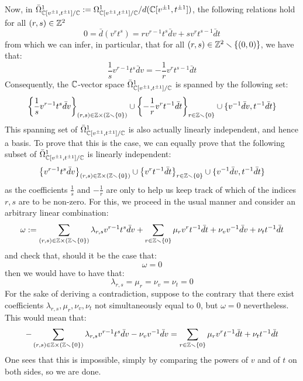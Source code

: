 \begin{example}
            Now, in $\bar{\Omega}^1_{\mathbb{C}[v^{\pm 1}, t^{\pm 1}]/\mathbb{C}} := \Omega^1_{\mathbb{C}[v^{\pm 1}, t^{\pm 1}]/\mathbb{C}}/d( \mathbb{C}[v^{\pm 1}, t^{\pm 1}] )$, the following relations hold for all $(r, s) \in \mathbb{Z}^2$
                $$0 = \bar{d}(v^r t^s) = r v^{r - 1} t^s \bar{d}v + s v^r t^{s - 1} \bar{d}t$$
            from which we can infer, in particular, that for all $(r, s) \in \mathbb{Z}^2 \smallsetminus \{(0, 0)\}$, we have that:
                $$\frac1s v^{r - 1} t^s \bar{d}v = -\frac1r v^r t^{s - 1} \bar{d}t$$
            Consequently, the $\mathbb{C}$-vector space $\bar{\Omega}^1_{\mathbb{C}[v^{\pm 1}, t^{\pm 1}]/\mathbb{C}}$ is spanned by the following set:
                $$\left\{ \frac1s v^{r - 1} t^s \bar{d}v \right\}_{(r, s) \in \Z \x (\Z \setminus \{0\})} \cup \left\{ -\frac1r v^r t^{-1} \bar{d}t \right\}_{r \in \Z \setminus \{0\}} \cup \{ v^{-1} \bar{d}v, t^{-1} \bar{d}t \}$$
            This spanning set of $\bar{\Omega}^1_{\mathbb{C}[v^{\pm 1}, t^{\pm 1}]/\mathbb{C}}$ is also actually linearly independent, and hence a basis. To prove that this is the case, we can equally prove that the following subset of $\bar{\Omega}^1_{\mathbb{C}[v^{\pm 1}, t^{\pm 1}]/\mathbb{C}}$ is linearly independent:
                $$\left\{ v^{r - 1} t^s \bar{d}v \right\}_{(r, s) \in \Z \x (\Z \setminus \{0\})} \cup \left\{ v^r t^{-1} \bar{d}t \right\}_{r \in \Z \setminus \{0\}} \cup \{ v^{-1} \bar{d}v, t^{-1} \bar{d}t \}$$
            as the coefficients $\frac1s$ and $-\frac1r$ are only to help us keep track of which of the indices $r, s$ are to be non-zero. For this, we proceed in the usual manner and consider an arbitrary linear combination:
                $$\omega := \sum_{(r, s) \in \Z \x (\Z \setminus \{0\})} \lambda_{r, s} v^{r - 1} t^s \bar{d}v + \sum_{r \in \Z \setminus \{0\}} \mu_r v^r t^{-1} \bar{d}t + \nu_v v^{-1} \bar{d}v + \nu_t t^{-1} \bar{d}t$$
            and check that, should it be the case that:
                $$\omega = 0$$
            then we would have to have that:
                $$\lambda_{r, s} = \mu_r = \nu_v = \nu_t = 0$$
            For the sake of deriving a contradiction, suppose to the contrary that there exist coefficients $\lambda_{r, s}, \mu_r, \nu_v, \nu_t$ not simultaneously equal to $0$, but $\omega = 0$ nevertheless. This would mean that:
                $$-\sum_{(r, s) \in \Z \x (\Z \setminus \{0\})} \lambda_{r, s} v^{r - 1} t^s \bar{d}v - \nu_v v^{-1} \bar{d}v = \sum_{r \in \Z \setminus \{0\}} \mu_r v^r t^{-1} \bar{d}t + \nu_t t^{-1} \bar{d}t$$
            One sees that this is impossible, simply by comparing the powers of $v$ and of $t$ on both sides, so we are done.
            

\end{example}
